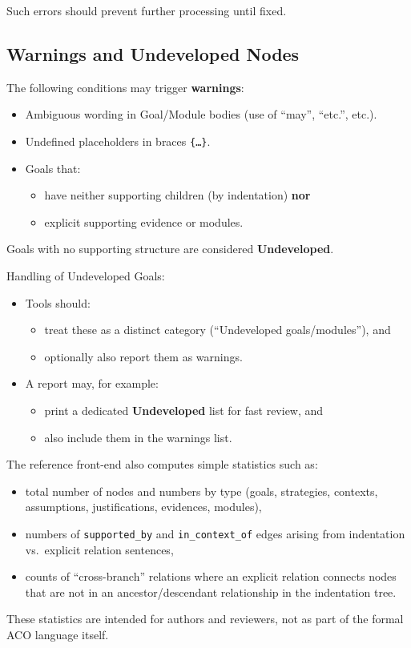 \documentclass[11pt]{article}
\begin{document}
Such errors should prevent further processing until fixed.

\subsection{Warnings and Undeveloped Nodes}

The following conditions may trigger \textbf{warnings}:

\begin{itemize}[leftmargin=2em]
  \item Ambiguous wording in Goal/Module bodies (use of ``may'', ``etc.'', etc.).
  \item Undefined placeholders in braces \texttt{\{\dots\}}.
  \item Goals that:
  \begin{itemize}[leftmargin=1.5em]
    \item have neither supporting children (by indentation) \textbf{nor}
    \item explicit supporting evidence or modules.
  \end{itemize}
\end{itemize}

Goals with no supporting structure are considered \textbf{Undeveloped}.

Handling of Undeveloped Goals:

\begin{itemize}[leftmargin=2em]
  \item Tools should:
  \begin{itemize}[leftmargin=1.5em]
    \item treat these as a distinct category (``Undeveloped goals/modules''), and
    \item optionally also report them as warnings.
  \end{itemize}
  \item A report may, for example:
  \begin{itemize}[leftmargin=1.5em]
    \item print a dedicated \textbf{Undeveloped} list for fast review, and
    \item also include them in the warnings list.
  \end{itemize}
\end{itemize}

The reference front-end also computes simple statistics such as:
\begin{itemize}[leftmargin=2em]
  \item total number of nodes and numbers by type (goals, strategies, contexts, assumptions, justifications, evidences, modules),
  \item numbers of \texttt{supported\_by} and \texttt{in\_context\_of} edges arising from indentation vs.\ explicit relation sentences,
  \item counts of ``cross-branch'' relations where an explicit relation connects nodes that are not in an ancestor/descendant relationship in the indentation tree.
\end{itemize}
These statistics are intended for authors and reviewers, not as part of the formal ACO language itself.
\end{document}
